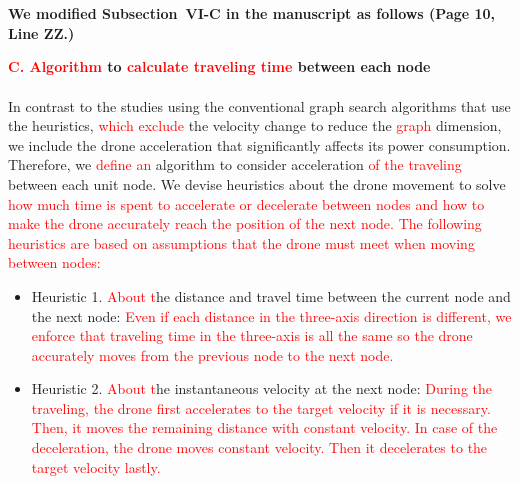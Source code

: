 \documentclass[onecolumn]{IEEEconf}
\begin{document}
\begin{description}
{	}
	~\\
    ~\\
	\textbf{We modified Subsection~VI-C in the manuscript as follows (Page 10, Line ZZ.)}
    \begin{mdframed} [ linewidth=.75pt, userdefinedwidth=0.9\textwidth]
    \textbf{\textcolor{red}{C. Algorithm} to \textcolor{red}{calculate traveling time} between each node}~\\
    ~\\
    In contrast to the studies using the conventional graph search algorithms that use the heuristics, \textcolor{red}{which exclude} the velocity change to reduce the \textcolor{red}{graph} dimension, we include the drone acceleration that significantly affects its power consumption.
    Therefore, we \textcolor{red}{define an} algorithm to consider acceleration \textcolor{red}{of the traveling} between each unit node. 
    We devise heuristics about the drone movement to solve \textcolor{red}{how much time is spent to accelerate or decelerate between nodes and how to make the drone accurately reach the position of the next node.
    The following heuristics are based on assumptions that the drone must meet when moving between nodes:}
    \begin{itemize}
    \item Heuristic 1. \textcolor{red}{About t}he distance and travel time between the current node and the next node: \textcolor{red}{Even if each distance in the three-axis direction is different, we enforce that traveling time in the three-axis is all the same so the drone accurately moves from the previous node to the next node.}
    \item Heuristic 2. \textcolor{red}{About t}he instantaneous velocity at the next node: \textcolor{red}{During the traveling, the drone first accelerates to the target velocity if it is necessary. Then, it moves the remaining distance with constant velocity. In case of the deceleration, the drone moves constant velocity. Then it decelerates to the target velocity lastly.}

\end{itemize}
\end{mdframed}
\end{description}
\end{document}

